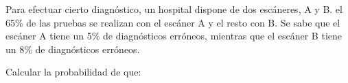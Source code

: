\documentclass[addpoints,spanish, 12pt,a4paper]{exam}
\renewcommand*\half{.5}
\begin{document}
\begin{questions}




\question Para efectuar cierto diagnóstico, un hospital dispone de dos escáneres, A y B.
el 65\% de las pruebas se realizan con el escáner A y el resto con B.
Se sabe que el escáner A tiene un 5\% de diagnósticos erróneos, mientras que el escáner B tiene un 8\% de diagnósticos erróneos.

Calcular la probabilidad de que:

\begin{parts}

\end{parts}
\end{questions}
\end{document}
